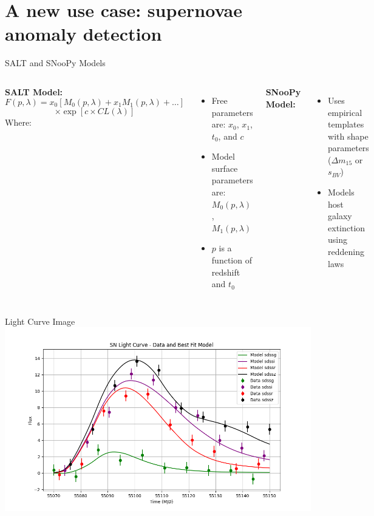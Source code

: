 \documentclass[aspectratio=169]{beamer}
\begin{document}
\section{A new use case: supernovae anomaly detection}

\begin{frame}{SALT and SNooPy Models}
    \begin{columns}[t] %
        \footnotesize
        \textbf{SALT Model:}
        \[
            F(p, \lambda) = x_0 \left[ M_0(p, \lambda) + x_1 M_1(p, \lambda) + \ldots \right] 
            \]
            \[
            \times \exp \left[ c \times CL(\lambda) \right]
        \]
        Where:
        \begin{itemize}
            \item Free parameters are: $x_0$, $x_1$, $t_0$, and $c$
            \item Model surface parameters are: $M_0(p, \lambda)$, $M_1(p, \lambda)$
            \item $p$ is a function of redshift and $t_0$
        \end{itemize}
        
        \footnotesize
        \textbf{SNooPy Model:}
        \begin{itemize}
            \item Uses empirical templates with shape parameters ($\Delta m_{15}$ or $s_{BV}$)
            \item Models host galaxy extinction using reddening laws
        \end{itemize}
    \end{columns}
\end{frame}

\begin{frame}{Light Curve Image}
    \centering
    \includegraphics[width=\textwidth]{images/sncosmo-fitter.png}
\end{frame}
\end{document}
